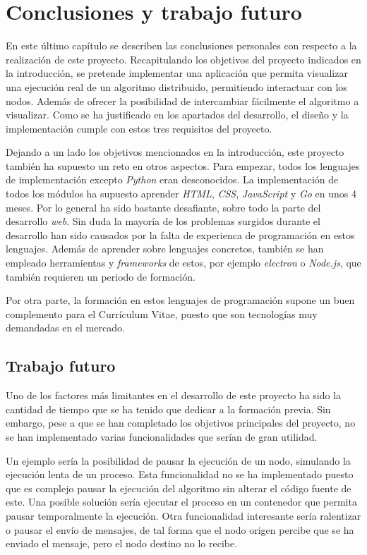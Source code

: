 \chapter{Conclusiones y trabajo futuro}

En este último capítulo se describen las conclusiones personales con respecto a la realización de este proyecto. Recapitulando los objetivos del proyecto indicados en la introducción, se pretende implementar una aplicación que permita visualizar una ejecución real de un algoritmo distribuido, permitiendo interactuar con los nodos. Además de ofrecer la posibilidad de intercambiar fácilmente el algoritmo a visualizar. Como se ha justificado en los apartados del desarrollo, el diseño y la implementación cumple con estos tres requisitos del proyecto.

Dejando a un lado los objetivos mencionados en la introducción, este proyecto también ha supuesto un reto en otros aspectos. Para empezar, todos los lenguajes de implementación excepto \textit{Python} eran desconocidos. La implementación de todos los módulos ha supuesto aprender \textit{HTML}, \textit{CSS}, \textit{JavaScript} y \textit{Go} en unos 4 meses. Por lo general ha sido bastante desafiante, sobre todo la parte del desarrollo \textit{web}. Sin duda la mayoría de los problemas surgidos durante el desarrollo han sido causados por la falta de experienca de programación en estos lenguajes. Además de aprender sobre lenguajes concretos, también se han empleado herramientas y \textit{frameworks} de estos, por ejemplo \textit{electron}\cite{electron} o \textit{Node.js}\cite{nodejs}, que también requieren un periodo de formación.

Por otra parte, la formación en estos lenguajes de programación supone un buen complemento para el Currículum Vitae, puesto que son tecnologías muy demandadas en el mercado. 

\section{Trabajo futuro}

Uno de los factores más limitantes en el desarrollo de este proyecto ha sido la cantidad de tiempo que se ha tenido que dedicar a la formación previa. Sin embargo, pese a que se han completado los objetivos principales del proyecto, no se han implementado varias funcionalidades que serían de gran utilidad.

Un ejemplo sería la posibilidad de pausar la ejecución de un nodo, simulando la ejecución lenta de un proceso. Esta funcionalidad no se ha implementado puesto que es complejo pausar la ejecución del algoritmo sin alterar el código fuente de este. Una posible solución sería ejecutar el proceso en un contenedor que permita pausar temporalmente la ejecución. Otra funcionalidad interesante sería ralentizar o pausar el envío de mensajes, de tal forma que el nodo origen percibe que se ha enviado el mensaje, pero el nodo destino no lo recibe.

